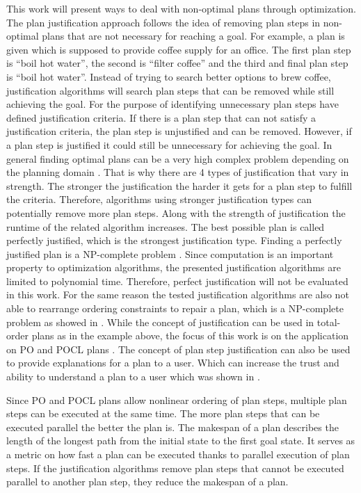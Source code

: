 This work will present ways to deal with non-optimal plans through optimization.
The plan justification approach follows the idea of removing plan steps 
in non-optimal plans that are not necessary for reaching a goal.
For example, a plan is given which is supposed to provide coffee supply for an office.
The first plan step is \enquote{boil hot water}, the second is \enquote{filter coffee} and the third and final plan step is \enquote{boil hot water}.
Instead of trying to search better options to brew coffee, justification algorithms will search plan steps that can 
be removed while still achieving the goal.
For the purpose of identifying unnecessary plan steps \cite{Justification} have defined 
justification criteria.
If there is a plan step that can not satisfy a justification criteria, the plan 
step is unjustified and can be removed.
However, if a plan step is justified it could still be unnecessary for achieving the goal.
In general finding optimal plans can be a very high complex problem depending on the planning domain \cite{Helmert}.
That is why there are 4 types of justification that vary in strength.
The stronger the justification the harder it gets for a plan step to fulfill the criteria.
Therefore, algorithms using stronger justification types can potentially remove more plan steps.
Along with the strength of justification the runtime of the related algorithm increases.
The best possible plan is called perfectly justified, which is the strongest justification type.
Finding a perfectly justified plan is a NP-complete problem \cite{Justification}.
Since computation is an important property to optimization algorithms, the presented
justification algorithms are limited to polynomial time.
Therefore, perfect justification will not be evaluated in this work.
For the same reason the tested justification algorithms are also not able to rearrange ordering constraints to repair a plan,
which is a NP-complete problem as showed in \cite{RemoveRepair}.
While the concept of justification can be used in total-order plans as in the example above,
the focus of this work is on the application on PO and POCL plans \cite{McAllester}.
The concept of plan step justification can also be used to provide explanations for a plan to a user.
Which can increase the trust and ability to understand a plan to a user which was shown in \cite{HomeTheater}. 

Since PO and POCL plans allow nonlinear ordering of plan steps, multiple plan steps can be executed at 
the same time.
The more plan steps that can be executed parallel the better the plan is.
The makespan of a plan describes the length of the longest path from the initial state to the first goal state.
It serves as a metric on how fast a plan can be executed thanks to parallel execution of plan steps.
If the justification algorithms remove plan steps that cannot be executed parallel to another plan step,
they reduce the makespan of a plan.


